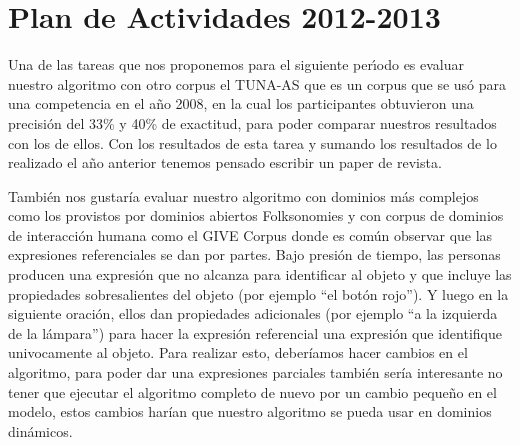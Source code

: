 \section{Plan de Actividades 2012-2013}
\label{plandetrabajo2}

Una de las tareas que nos proponemos para el siguiente per\'{\i}odo es evaluar nuestro algoritmo con otro corpus el TUNA-AS que es un corpus que se us\'o para una competencia en el a\~no 2008, en la cual los participantes obtuvieron una precisi\'on del 33\% y 40\% de exactitud, para poder comparar nuestros resultados con los de ellos. Con los resultados de esta tarea y sumando los resultados de lo realizado el a\~no anterior tenemos pensado escribir un paper de revista.

Tambi\'en nos gustar\'{i}a evaluar nuestro algoritmo con dominios m\'as complejos como los provistos por dominios abiertos Folksonomies y con corpus de dominios de interacci\'on humana como el GIVE Corpus donde es com\'un observar que las expresiones referenciales se dan por partes. Bajo presi\'on de tiempo, las personas producen una expresi\'on que no alcanza para identificar al objeto y que incluye las propiedades sobresalientes del objeto (por ejemplo ``el bot\'on rojo''). Y luego en la siguiente oraci\'on, ellos dan propiedades adicionales (por ejemplo ``a la izquierda de la l\'ampara'') para hacer la expresi\'on referencial una expresi\'on que identifique univocamente al objeto. Para realizar esto, deber\'iamos hacer cambios en el algoritmo, para poder dar una expresiones parciales tambi\'en ser\'{i}a interesante no tener que ejecutar el algoritmo completo de nuevo por un cambio peque\~no en el modelo, estos cambios har\'{i}an que nuestro algoritmo se pueda usar en dominios din\'amicos.



